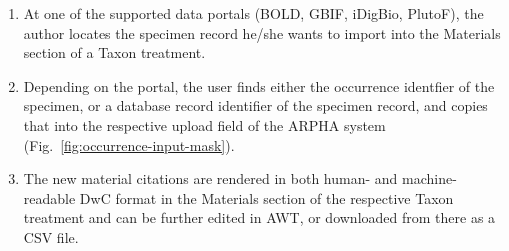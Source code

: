 \begin{enumerate}
\item{At one of the supported data portals (BOLD, GBIF, iDigBio, PlutoF), the author locates the specimen record he/she wants to import into the Materials section of a Taxon treatment.}
\item{Depending on the portal, the user finds either the occurrence identfier of the specimen, or a database record identifier of the specimen record, and copies that into the respective upload field of the ARPHA system (Fig.~\ref{fig:occurrence-input-mask}).}
\item{The new material citations are rendered in both human- and machine-readable DwC format in the Materials section of the respective Taxon treatment and can be further edited in AWT, or downloaded from there as a CSV file.}
\end{enumerate}

